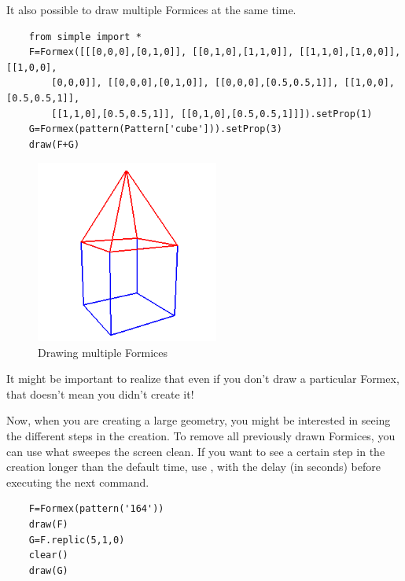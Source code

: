 {It also possible to draw multiple Formices at the same time.
\begin{verbatim}
	from simple import *
	F=Formex([[[0,0,0],[0,1,0]], [[0,1,0],[1,1,0]], [[1,1,0],[1,0,0]], [[1,0,0],
		[0,0,0]], [[0,0,0],[0,1,0]], [[0,0,0],[0.5,0.5,1]], [[1,0,0],[0.5,0.5,1]], 
		[[1,1,0],[0.5,0.5,1]], [[0,1,0],[0.5,0.5,1]]]).setProp(1)	
	G=Formex(pattern(Pattern['cube'])).setProp(3)
	draw(F+G)
\end{verbatim}
\begin{figure}[h]
  \centering
  \begin{makeimage}
  \end{makeimage}
  \begin{latexonly}
    \includegraphics[width=6cm]{images/house}
  \end{latexonly}
  \begin{htmlonly}
  \end{htmlonly}  
  \caption{Drawing multiple Formices}
  \label{fig:multiple}
\end{figure}
 
It might be important to realize that even if you don't draw a particular Formex, that doesn't mean you didn't create it!

Now, when you are creating a large geometry, you might be interested in seeing the different steps in the creation. To remove all previously drawn Formices, you can use   what sweepes the screen clean. If you want to see a certain step in the creation longer than the default time, use , with  the delay (in seconds) before executing the next command.
\begin{verbatim}
	F=Formex(pattern('164'))
	draw(F)
	G=F.replic(5,1,0)
	clear()
	draw(G)
\end{verbatim}


}
